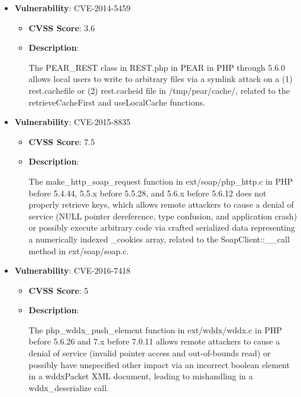 \documentclass{article}
\begin{document}
\begin{itemize}
        \item \textbf{Vulnerability}: CVE-2014-5459
        \begin{itemize}
            \item \textbf{CVSS Score}:  3.6 
            \item \textbf{Description}:
            \parbox[t]{0.9\linewidth}{
                \ttfamily The PEAR\_REST class in REST.php in PEAR in PHP through 5.6.0 allows local users to write to arbitrary files via a symlink attack on a (1) rest.cachefile or (2) rest.cacheid file in /tmp/pear/cache/, related to the retrieveCacheFirst and useLocalCache functions.
            }
        \end{itemize}
    
        \item \textbf{Vulnerability}: CVE-2015-8835
        \begin{itemize}
            \item \textbf{CVSS Score}:  7.5 
            \item \textbf{Description}:
            \parbox[t]{0.9\linewidth}{
                \ttfamily The make\_http\_soap\_request function in ext/soap/php\_http.c in PHP before 5.4.44, 5.5.x before 5.5.28, and 5.6.x before 5.6.12 does not properly retrieve keys, which allows remote attackers to cause a denial of service (NULL pointer dereference, type confusion, and application crash) or possibly execute arbitrary code via crafted serialized data representing a numerically indexed \_cookies array, related to the SoapClient::\_\_call method in ext/soap/soap.c.
            }
        \end{itemize}
    
        \item \textbf{Vulnerability}: CVE-2016-7418
        \begin{itemize}
            \item \textbf{CVSS Score}:  5 
            \item \textbf{Description}:
            \parbox[t]{0.9\linewidth}{
                \ttfamily The php\_wddx\_push\_element function in ext/wddx/wddx.c in PHP before 5.6.26 and 7.x before 7.0.11 allows remote attackers to cause a denial of service (invalid pointer access and out-of-bounds read) or possibly have unspecified other impact via an incorrect boolean element in a wddxPacket XML document, leading to mishandling in a wddx\_deserialize call.
            }
        \end{itemize}
    

\end{itemize}
\end{document}
